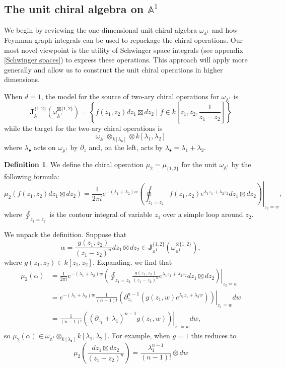 \documentclass[11pt]{amsart}
\theoremstyle{definition}
\newtheorem{defn}[thm]{Definition}
\theoremstyle{remark}
\numberwithin{equation}{section}
\newcommand{\bu}{\bullet}
\renewcommand{\AA}{\mathbb{A}}
\newcommand{\del}{\partial}
\begin{document}
\subsection{The unit chiral algebra on $\mathbb{A}^1$} \label{s:feynman1d}
We begin by reviewing the one-dimensional unit chiral algebra $\omega_{\mathbb{A}^1}$ and how Feynman graph integrals
can be used to repackage the chiral operations.
Our most novel viewpoint is the utility of Schwinger space integrals (see appendix \ref{Schwinger spaces}) to express
these operations. 
This approach will apply more generally and allow us to construct the unit chiral operations in higher dimensions.

When $d=1$, the model for the source of two-ary chiral operations for $\omega_{\AA^1}$ is
$$
\mathbf{J}_{\mathbb{A}^1}^{\{1,2\}}(\omega_{\mathbb{A}^1}^{\boxtimes\{1,2\}})=\left\{f(z_{1},z_{2})dz_{1}\boxtimes dz_{2} \; | \; f\in k\left[z_{1},z_{2},\frac{1}{z_{1}-z_{2}}\right]\right\}
$$
while the target for the two-ary chiral operations is 
\begin{equation}\label{}
  \omega_{\mathbb{A}^1} \otimes_{k[\lambda_\bu]} \otimes k[\lambda_1,\lambda_2] 
\end{equation}
where $\lambda_\bu$ acts on $\omega_{\AA^1}$ by $\del_z$ and, on the left, acts by $\lambda_\bu = \lambda_1 +
\lambda_2$.
\begin{defn}
  We define the chiral operation $\mu_2 = \mu_{\{1,2\}}$ for the unit $\omega_{\mathbb{A}^1}$ by the following formula:
    $$
    \mu_2(f(z_{1},z_{2})dz_{1}\boxtimes dz_{2})=\frac{1}{2\pi i}e^{-(\lambda_{1}+\lambda_{2})w}\left. \left(\oint_{z_{1}=z_2}f(z_{1},z_{2})e^{\lambda_{1}z_{1}+\lambda_{2}z_{2}}dz_{1}\boxtimes dz_{2}\right)\right|_{z_{2}=w},
    $$
    where $\oint_{z_{1}=z_{2}}$ is the contour integral of variable $z_{1}$ over a simple loop around $z_{2}$.
  \end{defn}

  We unpack the definition.
  Suppose that
$$\alpha=\frac{g(z_{1},z_{2})}{(z_{1}-z_{2})^{n}}dz_{1}\boxtimes dz_{2}\in \mathbf{J}_{\mathbb{A}^1}^{\{1,2\}}
(\omega_{\mathbb{A}^1}^{\boxtimes\{1,2\}}),
$$
where $g(z_{1},z_{2})\in k[z_{1},z_{2}]$.
Expanding, we find that
\begin{align*}
 \mu_2(\alpha)
 &=\frac{1}{2\pi i}e^{-(\lambda_{1}+\lambda_{2})w}\left. \left(\oint_{z_{1}=z_2}\frac{g(z_{1},z_{2})}{(z_{1}-z_{2})^{n}}e^{\lambda_{1}z_{1}+\lambda_{2}z_{2}}dz_{1}\boxtimes dz_{2}\right)\right|_{z_{2}=w}\\
 &= e^{-(\lambda_{1}+\lambda_{2})w}\frac{1}{(n-1)!}\left.\left(\partial_{z_{1}}^{n-1}\left(g(z_{1},w)e^{\lambda_{1}z_{1}+\lambda_{2}w}\right)\right)\right|_{z_{1}=w}dw
 \\
 &=\frac{1}{(n-1)!}
\left.\left((\partial_{z_{1}}+\lambda_{1})^{n-1}g(z_{1},w)\right)\right|_{z_{1}=w}dw,
\end{align*}
so $\mu_2(\alpha)\in \omega_{\mathbb{A}^{1}}\otimes_{k[\lambda_{\bullet}]}k[\lambda_{1},\lambda_{2}].$
For example, when $g = 1$ this reduces to
\begin{equation}
  \mu_2\left(\frac{d z_{1} \boxtimes d z_{2}}{(z_{1}-z_{2})^{n}}\right) = \frac{\lambda_{1}^{n-1}}{(n-1)!} \otimes d w
\end{equation}
\end{document}

